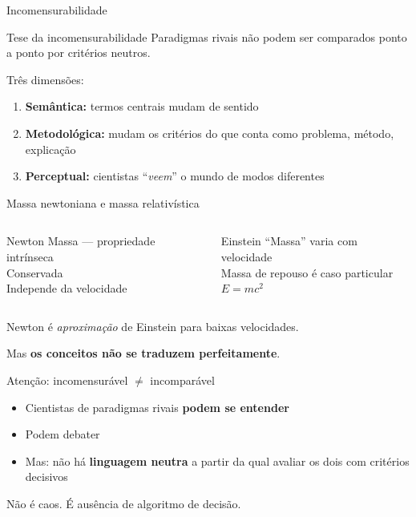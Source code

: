 \documentclass[aspectratio=169]{beamer}
\newcommand{\impt}[1]{\textcolor{maccent}{\textbf{#1}}}
\newcommand{\ntc}[1]{\textcolor{mprimary}{#1}}
\begin{document}
\begin{frame}{Incomensurabilidade}
\begin{block}{Tese da incomensurabilidade}
Paradigmas rivais não podem ser comparados ponto a ponto por critérios neutros.
\end{block}
\pause
\vspace{0.4cm}
Três dimensões:
\begin{enumerate}
  \pause
  \item \impt{Semântica:} termos centrais mudam de sentido
  \pause
  \item \impt{Metodológica:} mudam os critérios do que conta como problema, método, explicação
  \pause
  \item \impt{Perceptual:} cientistas ``\emph{veem}'' o mundo de modos diferentes
\end{enumerate}
\end{frame}

\begin{frame}{Massa newtoniana e massa relativística}
\begin{columns}[t]
\begin{block}{Newton}
Massa --- propriedade intrínseca \\
Conservada \\
Independe da velocidade
\end{block}

\pause
\begin{block}{Einstein}
``Massa'' varia com velocidade \\
Massa de repouso é caso particular \\
$E = mc^2$
\end{block}
\end{columns}
\vspace{0.5cm}
\pause
Newton é \emph{aproximação} de Einstein para baixas velocidades.
\vspace{0.2cm}
\pause
\begin{alertblock}{}
Mas \impt{os conceitos não se traduzem perfeitamente}.
\end{alertblock}
\end{frame}

\begin{frame}{Atenção: incomensurável $\neq$ incomparável}
\begin{itemize}
  \item Cientistas de paradigmas rivais \impt{podem se entender}
  \pause
  \item Podem debater
  \pause
  \item Mas: não há \impt{linguagem neutra} a partir da qual avaliar os dois com critérios decisivos
\end{itemize}
\vspace{0.4cm}
\pause
\ntc{Não é caos.} É ausência de algoritmo de decisão.
\end{frame}
\end{document}
